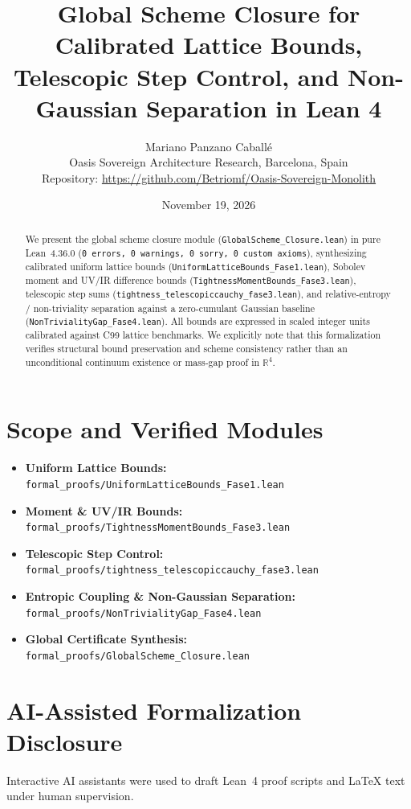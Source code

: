 \documentclass[11pt,a4paper]{article}
\title{\textbf{Global Scheme Closure for Calibrated Lattice Bounds, Telescopic Step Control, and Non-Gaussian Separation in Lean 4}}
\author{Mariano Panzano Caball\'e \\ \small Oasis Sovereign Architecture Research, Barcelona, Spain \\ \small Repository: \url{https://github.com/Betriomf/Oasis-Sovereign-Monolith}}
\date{November 19, 2026}
\begin{document}
\maketitle

\begin{abstract}
We present the global scheme closure module (\texttt{GlobalScheme\_Closure.lean}) in pure Lean~4.36.0 (\texttt{0 errors, 0 warnings, 0 sorry, 0 custom axioms}), synthesizing calibrated uniform lattice bounds (\texttt{UniformLatticeBounds\_Fase1.lean}), Sobolev moment and UV/IR difference bounds (\texttt{TightnessMomentBounds\_Fase3.lean}), telescopic step sums (\texttt{tightness\_telescopiccauchy\_fase3.lean}), and relative-entropy / non-triviality separation against a zero-cumulant Gaussian baseline (\texttt{NonTrivialityGap\_Fase4.lean}). All bounds are expressed in scaled integer units calibrated against C99 lattice benchmarks. We explicitly note that this formalization verifies structural bound preservation and scheme consistency rather than an unconditional continuum existence or mass-gap proof in $\mathbb{R}^4$.
\end{abstract}

\section{Scope and Verified Modules}
\begin{itemize}
  \item \textbf{Uniform Lattice Bounds:} \texttt{formal\_proofs/UniformLatticeBounds\_Fase1.lean}
  \item \textbf{Moment \& UV/IR Bounds:} \texttt{formal\_proofs/TightnessMomentBounds\_Fase3.lean}
  \item \textbf{Telescopic Step Control:} \texttt{formal\_proofs/tightness\_telescopiccauchy\_fase3.lean}
  \item \textbf{Entropic Coupling \& Non-Gaussian Separation:} \texttt{formal\_proofs/NonTrivialityGap\_Fase4.lean}
  \item \textbf{Global Certificate Synthesis:} \texttt{formal\_proofs/GlobalScheme\_Closure.lean}
\end{itemize}

\section{AI-Assisted Formalization Disclosure}
Interactive AI assistants were used to draft Lean~4 proof scripts and LaTeX text under human supervision.
\end{document}

